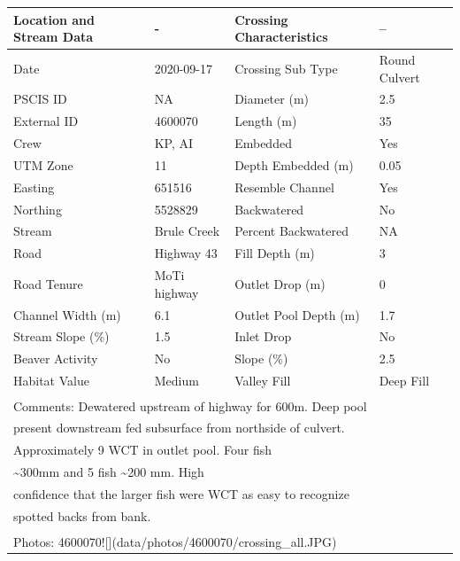 \documentclass[
]{book}
\begin{document}
\begin{tabular}{l|l|l|l}
\hline
Location and Stream Data & - & Crossing Characteristics & --\\
\hline
Date & 2020-09-17 & Crossing Sub Type & Round Culvert\\
\hline
PSCIS ID & NA & Diameter (m) & 2.5\\
\hline
External ID & 4600070 & Length (m) & 35\\
\hline
Crew & KP, AI & Embedded & Yes\\
\hline
UTM Zone & 11 & Depth Embedded (m) & 0.05\\
\hline
Easting & 651516 & Resemble Channel & Yes\\
\hline
Northing & 5528829 & Backwatered & No\\
\hline
Stream & Brule Creek & Percent Backwatered & NA\\
\hline
Road & Highway 43 & Fill Depth (m) & 3\\
\hline
Road Tenure & MoTi highway & Outlet Drop (m) & 0\\
\hline
Channel Width (m) & 6.1 & Outlet Pool Depth (m) & 1.7\\
\hline
Stream Slope (\%) & 1.5 & Inlet Drop & No\\
\hline
Beaver Activity & No & Slope (\%) & 2.5\\
\hline
Habitat Value & Medium & Valley Fill & Deep Fill\\
\hline
\multicolumn{4}{l}{\textsuperscript{} Comments: Dewatered upstream of highway for 600m. Deep pool}\\
\multicolumn{4}{l}{present downstream fed subsurface from northside of culvert.}\\
\multicolumn{4}{l}{Approximately 9 WCT in outlet pool.  Four fish}\\
\multicolumn{4}{l}{\textasciitilde{}300mm and 5 fish \textasciitilde{}200 mm. High}\\
\multicolumn{4}{l}{confidence that the larger fish were WCT as easy to recognize}\\
\multicolumn{4}{l}{spotted backs from bank.}\\
\multicolumn{4}{l}{\textsuperscript{} Photos: 4600070![](data/photos/4600070/crossing\_all.JPG)}\\
\end{tabular}
\end{document}
